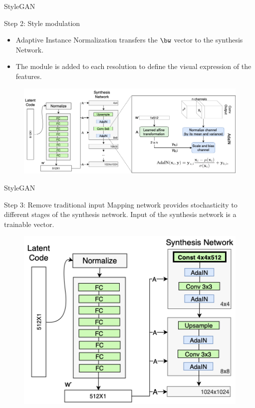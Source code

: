 \begin{frame}{StyleGAN}
	\begin{block}{Step 2: Style modulation}
		\begin{itemize}
			\item Adaptive Instance Normalization transfers the $\bw$ vector to the synthesis Network.
			\item The module is added to each resolution to define the visual expression of the features.
		\end{itemize}
		\begin{figure}
			\centering
			\includegraphics[width=1.0\linewidth]{figs/stylegan_adain}
		\end{figure}
	\end{block}

\end{frame}
\begin{frame}{StyleGAN}
	\begin{block}{Step 3: Remove traditional input}
		Mapping network provides stochasticity to different stages of the synthesis network. Input of the synthesis network is a trainable vector.
		\begin{figure}
			\centering
			\includegraphics[width=0.55\linewidth]{figs/stylegan_input}
		\end{figure}
	\end{block}

\end{frame}
